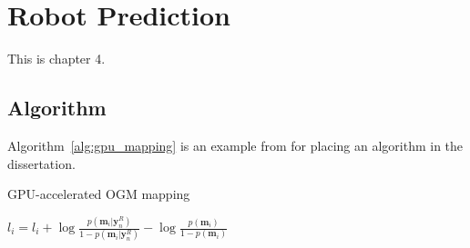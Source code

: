 \chapter{Robot Prediction}
\pagestyle{plain}

This is chapter 4.

\section{Algorithm}

Algorithm~\ref{alg:gpu_mapping} is an example from \cite{xie2024scope, xie2023stochastic} for placing an algorithm in the dissertation.

\begin{algorithm}[t]
    \DontPrintSemicolon
    \caption{GPU-accelerated OGM mapping}
    \label{alg:gpu_mapping}
    
    
    \begin{algorithmic}[1]  
            
            \STATE    $l_i = l_i + \log \frac{p(\mathbf{m}_i|\mathbf{y}^R_{n})}{1-p(\mathbf{m}_i|\mathbf{y}^R_{n})} - \log \frac{p(\mathbf{m}_i)}{1-p(\mathbf{m}_i)}$
            
            \ENDFOR 
        \ENDFOR
    \end{algorithmic}
\end{algorithm}
